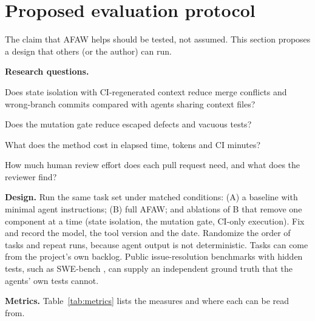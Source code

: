 \documentclass[11pt,a4paper]{article}
\begin{document}
\section{Proposed evaluation protocol}
\label{sec:eval}

The claim that AFAW helps should be tested, not assumed. This section proposes a design that others (or the author) can run.

\textbf{Research questions.}
\begin{description}[leftmargin=0pt, labelindent=0pt, itemsep=2pt]
  \item[RQ1] Does state isolation with CI-regenerated context reduce merge conflicts and wrong-branch commits compared with agents sharing context files?
  \item[RQ2] Does the mutation gate reduce escaped defects and vacuous tests?
  \item[RQ3] What does the method cost in elapsed time, tokens and CI minutes?
  \item[RQ4] How much human review effort does each pull request need, and what does the reviewer find?
\end{description}

\textbf{Design.} Run the same task set under matched conditions: (A) a baseline with minimal agent instructions; (B) full AFAW; and ablations of B that remove one component at a time (state isolation, the mutation gate, CI-only execution). Fix and record the model, the tool version and the date. Randomize the order of tasks and repeat runs, because agent output is not deterministic. Tasks can come from the project's own backlog. Public issue-resolution benchmarks with hidden tests, such as SWE-bench \cite{jimenez2024}, can supply an independent ground truth that the agents' own tests cannot.

\textbf{Metrics.} Table~\ref{tab:metrics} lists the measures and where each can be read from.
\end{document}
